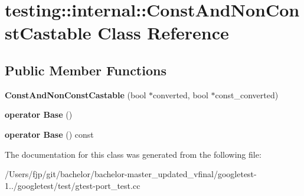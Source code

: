 \hypertarget{classtesting_1_1internal_1_1_const_and_non_const_castable}{}\section{testing\+:\+:internal\+:\+:Const\+And\+Non\+Const\+Castable Class Reference}
\label{classtesting_1_1internal_1_1_const_and_non_const_castable}
\subsection*{Public Member Functions}
\begin{DoxyCompactItemize}
\item 
\mbox{\label{classtesting_1_1internal_1_1_const_and_non_const_castable_aebe0ef6897b7f805e227bb969d4ee034}} 
{\bfseries Const\+And\+Non\+Const\+Castable} (bool $\ast$converted, bool $\ast$const\+\_\+converted)
\item 
\mbox{\label{classtesting_1_1internal_1_1_const_and_non_const_castable_aff0c372d429d76d002bb29f83f2429fa}} 
{\bfseries operator Base} ()
\item 
\mbox{\label{classtesting_1_1internal_1_1_const_and_non_const_castable_a4e8ee8051162f1dfc1da294c71481e2f}} 
{\bfseries operator Base} () const
\end{DoxyCompactItemize}


The documentation for this class was generated from the following file\+:\begin{DoxyCompactItemize}
\item 
/\+Users/fjp/git/bachelor/bachelor-\/master\+\_\+updated\+\_\+vfinal/googletest-\/1../googletest/test/gtest-\/port\+\_\+test.\+cc\end{DoxyCompactItemize}
